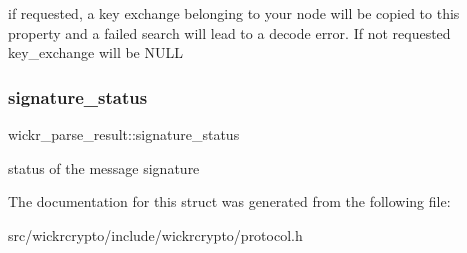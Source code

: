 if requested, a key exchange belonging to your node will be copied to this property and a failed search will lead to a decode error. If not requested key\+\_\+exchange will be N\+U\+LL \mbox{\label{structwickr__parse__result_a989166b5471898853f03b9e9c58f69c0}} 
\subsubsection{\texorpdfstring{signature\+\_\+status}{signature\_status}}
{\footnotesize\ttfamily wickr\+\_\+parse\+\_\+result\+::signature\+\_\+status}

status of the message signature 

The documentation for this struct was generated from the following file\+:\begin{DoxyCompactItemize}
\item 
src/wickrcrypto/include/wickrcrypto/protocol.\+h\end{DoxyCompactItemize}
